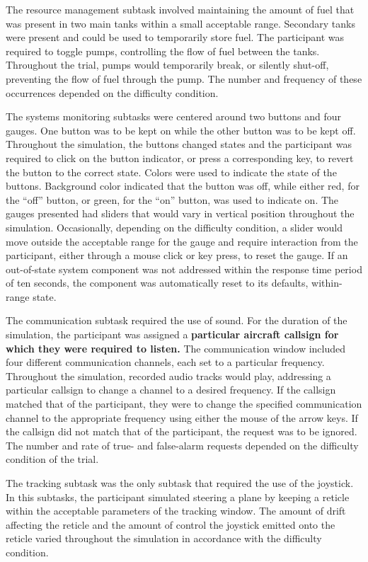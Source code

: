 \documentclass[11pt]{article}
\begin{document}
	The resource management subtask involved maintaining the amount of fuel that was present in two main tanks within a small acceptable range. Secondary tanks were present and could be used to temporarily store fuel. The participant was required to toggle pumps, controlling the flow of fuel between the tanks. Throughout the trial, pumps would temporarily break, or silently shut-off, preventing the flow of fuel through the pump. The number and frequency of these occurrences depended on the difficulty condition.
	
	The systems monitoring subtasks were centered around two buttons and four gauges. One button was to be kept on while the other button was to be kept off. Throughout the simulation, the buttons changed states and the participant was required to click on the button indicator, or press a corresponding key, to revert the button to the correct state. Colors were used to indicate the state of the buttons. Background color indicated that the button was off, while either red, for the ``off'' button, or green, for the ``on'' button, was used to indicate on. The gauges presented had sliders that would vary in vertical position throughout the simulation. Occasionally, depending on the difficulty condition, a slider would move outside the acceptable range for the gauge and require interaction from the participant, either through a mouse click or key press, to reset the gauge. If an out-of-state system component was not addressed within the response time period of ten seconds, the component was automatically reset to its defaults, within-range state.
	
	The communication subtask required the use of sound. For the duration of the simulation, the participant was assigned a {\bf particular aircraft callsign for which they were required to listen. } The communication window included four different communication channels, each set to a particular frequency. Throughout the simulation, recorded audio tracks would play, addressing a particular callsign to change a channel to a desired frequency. If the callsign matched that of the participant, they were to change the specified communication channel to the appropriate frequency using either the mouse of the arrow keys. If the callsign did not match that of the participant, the request was to be ignored. The number and rate of true- and false-alarm requests depended on the difficulty condition of the trial.
	
	The tracking subtask was the only subtask that required the use of the joystick. In this subtasks, the participant simulated steering a plane by keeping a reticle within the acceptable parameters of the tracking window. The amount of drift affecting the reticle and the amount of control the joystick emitted onto the reticle varied throughout the simulation in accordance with the difficulty condition. 
	
\end{document}
